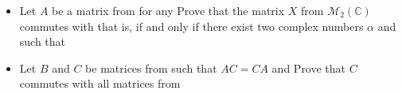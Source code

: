 
\begin{itemize}
	\item Let $A$ be a matrix from  
for any  Prove that the matrix $X$ from $\mathcal{M}
_{2}(\mathbb{C})$ commutes with  that is,  if and only if there
exist two complex numbers $\alpha$ and  such that 
	\item Let  $B$ and $C$ be matrices from  such
that  $AC=CA$ and  Prove that $C$ commutes with all
matrices from 
\end{itemize}
